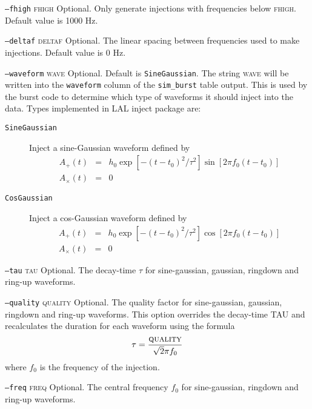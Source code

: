\begin{entry}
\begin{entry}
\item[\texttt{--fhigh} \textsc{fhigh}]
Optional.  Only generate injections with frequencies below
\textsc{fhigh}.  Default value is 1000 Hz.

\item[\texttt{--deltaf} \textsc{deltaf}]
Optional.  The linear spacing between frequencies used to make
injections.  Default value is 0 Hz.

\item[\texttt{--waveform} \textsc{wave}]
Optional.  Default is \texttt{SineGaussian}.   The string
\textsc{wave} will be written into the \texttt{waveform} column of the
\texttt{sim\_burst} table output. This is used by the burst code to
determine which type of waveforms it should inject into the data.
Types implemented in LAL inject package are:
\begin{description}
\item[\texttt{SineGaussian}]  Inject a sine-Gaussian waveform defined by
\begin{eqnarray}
A_+(t) &=& h_0 \exp[ - (t-t_0)^2/ \tau^2 ] \sin[ 2 \pi f_0 (t-t_0)] \\
A_\times(t) &=& 0
\end{eqnarray}

\item[\texttt{CosGaussian}]  Inject a cos-Gaussian waveform defined by
\begin{eqnarray}
A_+(t) &=& h_0 \exp[ - (t-t_0)^2/ \tau^2 ] \cos[ 2 \pi f_0 (t-t_0)] \\
A_\times(t) &=& 0
\end{eqnarray}
\end{description}

\item[\texttt{--tau} \textsc{tau}]
Optional.  The decay-time $\tau$ for sine-gaussian,  gaussian,  ringdown and
ring-up waveforms.

\item[\texttt{--quality} \textsc{quality}]
Optional.  The quality factor for sine-gaussian,  gaussian,  ringdown and
ring-up waveforms.    This option overrides the decay-time
\textsc{TAU} and recalculates the duration for each waveform using the
formula
$$ 
\tau = \frac{ \textsc{quality} }{ \sqrt{2} \pi f_0 }
$$
where $f_0$ is the frequency of the injection.

\item[\texttt{--freq} \textsc{freq}]
Optional.  The central frequency $f_0$ for sine-gaussian,  ringdown and
ring-up waveforms.


\end{entry}
\end{entry}
